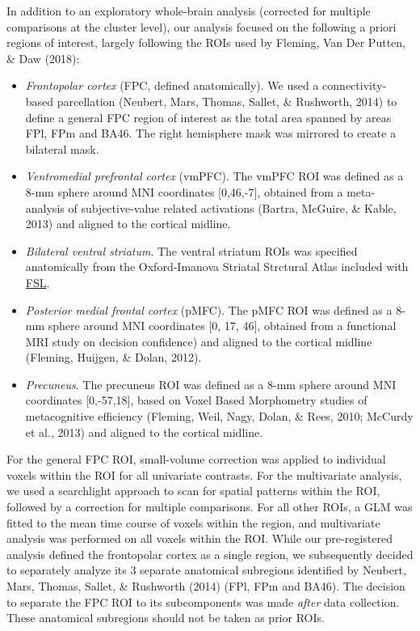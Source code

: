 \documentclass[12pt,twoside]{reedthesis}
\begin{document}
In addition to an exploratory whole-brain analysis (corrected for multiple comparisons at the cluster level), our analysis focused on the following a priori regions of interest, largely following the ROIs used by Fleming, Van Der Putten, \& Daw (2018):
\begin{itemize}
\item
  \emph{Frontopolar cortex} (FPC, defined anatomically). We used a connectivity-based parcellation (Neubert, Mars, Thomas, Sallet, \& Rushworth, 2014) to define a general FPC region of interest as the total area spanned by areas FPl, FPm and BA46. The right hemisphere mask was mirrored to create a bilateral mask.
\item
  \emph{Ventromedial prefrontal cortex} (vmPFC). The vmPFC ROI was defined as a 8-mm sphere around MNI coordinates {[}0,46,-7{]}, obtained from a meta-analysis of subjective-value related activations (Bartra, McGuire, \& Kable, 2013) and aligned to the cortical midline.
\item
  \emph{Bilateral ventral striatum}. The ventral striatum ROIs was specified anatomically from the Oxford-Imanova Striatal Strctural Atlas included with \href{http://fsl.fmrib.ox.ac.uk}{FSL}.
\item
  \emph{Posterior medial frontal cortex} (pMFC). The pMFC ROI was defined as a 8-mm sphere around MNI coordinates {[}0, 17, 46{]}, obtained from a functional MRI study on decision confidence) and aligned to the cortical midline (Fleming, Huijgen, \& Dolan, 2012).
\item
  \emph{Precuneus}. The precuneus ROI was defined as a 8-mm sphere around MNI coordinates {[}0,-57,18{]}, based on Voxel Based Morphometry studies of metacognitive efficiency (Fleming, Weil, Nagy, Dolan, \& Rees, 2010; McCurdy et al., 2013) and aligned to the cortical midline.
\end{itemize}
For the general FPC ROI, small-volume correction was applied to individual voxels within the ROI for all univariate contrasts. For the multivariate analysis, we used a searchlight approach to scan for spatial patterns within the ROI, followed by a correction for multiple comparisons. For all other ROIs, a GLM was fitted to the mean time course of voxels within the region, and multivariate analysis was performed on all voxels within the ROI.
While our pre-registered analysis defined the frontopolar cortex as a single region, we subsequently decided to separately analyze its 3 separate anatomical subregions identified by Neubert, Mars, Thomas, Sallet, \& Rushworth (2014) (FPl, FPm and BA46). The decision to separate the FPC ROI to its subcomponents was made \emph{after} data collection. These anatomical subregions should not be taken as prior ROIs.
\end{document}
